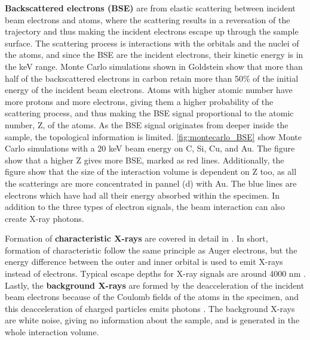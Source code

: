\textbf{Backscattered electrons (BSE)} are from elastic scattering between incident beam electrons and atoms, where the scattering results in a reversation of the trajectory and thus making the incident electrons escape up through the sample surface.
The scattering process is interactions with the orbitals and the nuclei of the atoms, and since the BSE are the incident electrons, their kinetic energy is in the keV range.
Monte Carlo simulations shown in Goldstein \cite[Fig. 2.16 b]{goldstein_scanning_2018} show that more than half of the backscattered electrons in carbon retain more than 50\% of the initial energy of the incident beam electrons.
Atoms with higher atomic number have more protons and more electrons, giving them a higher probability of the scattering process, and thus making the BSE signal proportional to the atomic number, Z, of the atoms.
As the BSE signal originates from deeper inside the sample, the topological information is limited.
\cref{fig:montecarlo_BSE} show Monte Carlo simulations with a 20 keV beam energy on C, Si, Cu, and Au.
The figure show that a higher Z gives more BSE, marked as red lines.
Additionally, the figure show that the size of the interaction volume is dependent on Z too, as all the scatterings are more concentrated in pannel (d) with Au.
The blue lines are electrons which have had all their energy absorbed within the specimen.
In addition to the three types of electron signals, the beam interaction can also create X-ray photons.


Formation of \textbf{characteristic X-rays} are covered in detail in .
In short, formation of characteristic follow the same principle as Auger electrons, but the energy difference between the outer and inner orbital is used to emit X-rays instead of electrons.
Typical escape depths for X-ray signals are around 4000 nm \cite{hollas_modern_2004}.
Lastly, the \textbf{background X-rays} are formed by the deacceleration of the incident beam electrons because of the Coulomb fields of the atoms in the specimen, and this deacceleration of charged particles emits photons \cite{notaros_electromagnetics_2010}.
The background X-rays are white noise, giving no information about the sample, and is generated in the whole interaction volume.



